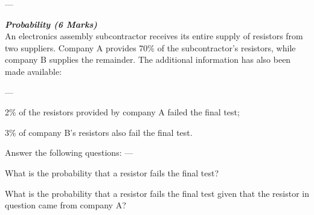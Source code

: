 


--- 
\item[(a)]  \textbf{\textit{Probability (6 Marks)}}\\
An electronics assembly subcontractor receives its entire supply of resistors from two suppliers. Company A provides 70\% of the subcontractor's resistors, while company B supplies the remainder. The additional information has also been made available:

--- 
\item[{$\bullet$}] 2\% of the resistors provided by company A failed the final test;
\item[{$\bullet$}] 3\% of company B's resistors also fail the final test.

\noindent Answer the following questions:
--- 
\item[(i)] What is the probability that a resistor fails the final test?
\item[(ii)] What is the probability that a resistor fails the final test given that the resistor in question came from company A?

